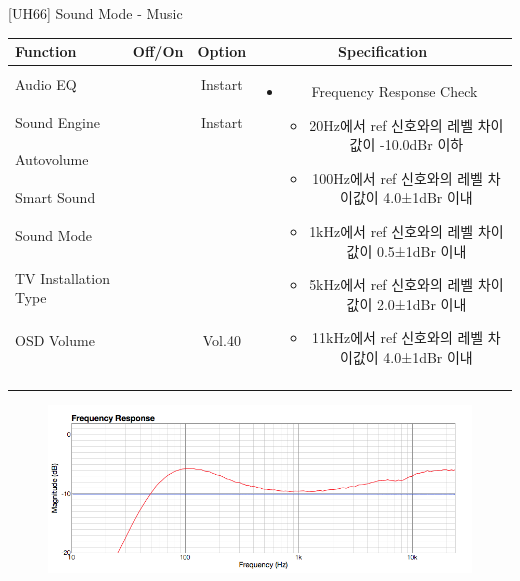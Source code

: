 \begin{frame}[t]{[UH66] Sound Mode - Music}
\begin{tiny}
\begin{tabular}{@{}lccc@{}}
\toprule
Function & Off/On & Option & Specification \\
\midrule
Audio EQ & \color{black}{Off} & Instart &
\multirow{10}{60mm}{
\begin{itemize}
\item Frequency Response Check
	\begin{itemize}
	\item 20Hz에서 ref 신호와의 레벨 차이값이 -10.0dBr 이하
	\item 100Hz에서 ref 신호와의 레벨 차이값이 4.0±1dBr 이내
	\item 1kHz에서 ref 신호와의 레벨 차이값이 0.5±1dBr 이내
	\item 5kHz에서 ref 신호와의 레벨 차이값이 2.0±1dBr 이내
	\item 11kHz에서 ref 신호와의 레벨 차이값이 4.0±1dBr 이내
	\end{itemize}
\end{itemize}
} \\
Sound Engine & \color{blue}{On} & Instart & \\
Autovolume & \color{black}{Off} & & \\
Smart Sound & \color{black}{Off} & & \\
Sound Mode & \color{blue}{On} & \color{blue}{Music} & \\
TV Installation Type & \color{blue}{On} & \color{black}{Standtype1} & \\
OSD Volume & \color{blue}{On} & Vol.40 & \\
& & & \\
& & & \\
& & & \\
& & & \\
\midrule
\end{tabular}
\end{tiny}

\begin{figure}[b]
\includegraphics[height=0.4\textwidth]{figures/music.png}
\end{figure}

\end{frame}

